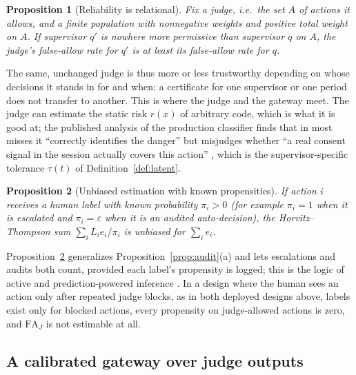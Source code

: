 \documentclass[11pt]{article}
\newtheorem{proposition}{Proposition}
\begin{document}
\begin{proposition}[Reliability is relational]\label{prop:judge-rel}
Fix a judge, i.e.\ the set $A$ of actions it allows, and a finite population
with nonnegative weights and positive total weight on $A$. If supervisor $q'$ is nowhere more permissive than
supervisor $q$ on $A$, the judge's false-allow rate for $q'$ is at least its
false-allow rate for $q$.
\end{proposition}

The same, unchanged judge is thus more or less trustworthy depending on whose
decisions it stands in for and when: a certificate for one supervisor or one
period does not transfer to another. This is where the judge and the gateway
meet. The judge can estimate the static risk $r(x)$ of arbitrary code, which
is what it is good at; the published analysis of the production classifier
finds that in most misses it ``correctly identifies the danger'' but misjudges
whether ``a real consent signal in the session actually covers this action''
\citep{hughes2026automode}, which is the supervisor-specific tolerance
$\tau(t)$ of Definition~\ref{def:latent}.

\begin{proposition}[Unbiased estimation with known propensities]\label{prop:judge-ht}
If action $i$ receives a human label with known probability $\pi_i > 0$
(for example $\pi_i = 1$ when it is escalated and $\pi_i = \varepsilon$ when it
is an audited auto-decision), the Horvitz--Thompson sum
$\sum_i L_i e_i/\pi_i$ is unbiased for $\sum_i e_i$.
\end{proposition}

Proposition~\ref{prop:judge-ht} generalizes Proposition~\ref{prop:audit}(a) and
lets escalations and audits both count, provided each label's propensity is
logged; this is the logic of active and prediction-powered inference
\citep{zrnic2024active,angelopoulos2023ppi}. In a design where the human sees
an action only after repeated judge blocks, as in both deployed designs above,
labels exist only for blocked actions, every propensity on judge-allowed
actions is zero, and $\mathrm{FA}_J$ is not estimable at all.

\subsection{A calibrated gateway over judge outputs}\label{sec:judge-gateway}
\end{document}
